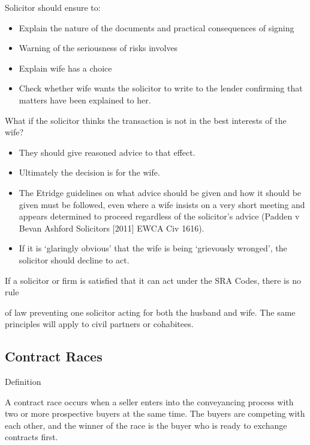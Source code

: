 \documentclass[
]{article}
\providecommand{\tightlist}{%
  \setlength{\itemsep}{0pt}\setlength{\parskip}{0pt}}
\newenvironment{env-615494ee-4c11-425d-a24a-676608cc22a4}
{
    \savenotes\tcolorbox[blanker,breakable,left=5pt,borderline west={2pt}{-4pt}{gold}]
}
{
    \endtcolorbox\spewnotes
}
\newenvironment{env-d6ce83a0-f7a8-46b6-be95-b1235f1feb63}
{
    \savenotes\tcolorbox[blanker,breakable,left=5pt,borderline west={2pt}{-4pt}{gray}]
}
{
    \endtcolorbox\spewnotes
}
\begin{document}
Solicitor should ensure to:

\begin{itemize}
\tightlist
\item
  Explain the nature of the documents and practical consequences of
  signing
\item
  Warning of the seriousness of risks involves
\item
  Explain wife has a choice
\item
  Check whether wife wants the solicitor to write to the lender
  confirming that matters have been explained to her.
\end{itemize}

\begin{env-d6ce83a0-f7a8-46b6-be95-b1235f1feb63}

What if the solicitor thinks the transaction is not in the best
interests of the wife?

\begin{itemize}
\tightlist
\item
  They should give reasoned advice to that effect.
\item
  Ultimately the decision is for the wife.
\item
  The Etridge guidelines on what advice should be given and how it
  should be given must be followed, even where a wife insists on a very
  short meeting and appears determined to proceed regardless of the
  solicitor's advice (Padden v Bevan Ashford Solicitors {[}2011{]} EWCA
  Civ 1616).
\item
  If it is `glaringly obvious' that the wife is being `grievously
  wronged', the solicitor should decline to act.
\end{itemize}

\end{env-d6ce83a0-f7a8-46b6-be95-b1235f1feb63}

If a solicitor or firm is satisfied that it can act under the SRA Codes,
there is no rule

of law preventing one solicitor acting for both the husband and wife.
The same principles will apply to civil partners or cohabitees.

\hypertarget{contract-races}{%
\subsection{Contract Races}\label{contract-races}}

\begin{env-615494ee-4c11-425d-a24a-676608cc22a4}

Definition

A contract race occurs when a seller enters into the conveyancing
process with two or more prospective buyers at the same time. The buyers
are competing with each other, and the winner of the race is the buyer
who is ready to exchange contracts first.

\end{env-615494ee-4c11-425d-a24a-676608cc22a4}
\end{document}
